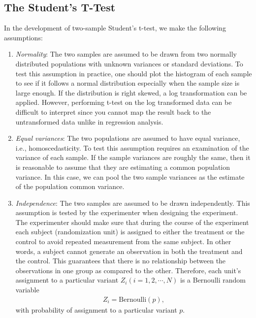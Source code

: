 \documentclass[10pt, aps,twocolumn, superscriptaddress, nofootinbib]{revtex4-2}
\begin{document}
\subsection{The Student's T-Test}
In the development of  two-sample Student's t-test, we make the following assumptions:
\begin{enumerate}
	\item \textit{Normality}: The two samples are assumed to be drawn from two normally distributed populations with unknown variances or standard deviations. To test this assumption in practice, one should plot the histogram of each sample to see if it follows a normal distribution especially when the sample size is large enough. If the distribution is right skewed, a log transformation can be applied. However, performing t-test on the log transformed data can be difficult to interpret since you cannot map the result back to the untransformed data unlike in regression analysis.
	
	
	\item \textit{Equal variances}: The two populations are assumed to have equal variance, i.e.,  homoscedasticity. To test this assumption  requires an examination of the variance of each sample. If the sample variances are roughly the same, then it is reasonable to assume that they are estimating a common population variance. In this case, we can pool the two sample variances as the estimate of the population common  variance. 
	
	\item \textit{Independence}: The two samples are assumed to be drawn independently. This assumption is tested by the experimenter when designing the experiment. The experimenter should make sure that during the course of the experiment each subject (randomization unit) is assigned to either the treatment or the control to avoid repeated measurement from the same subject. In other words, a subject cannot generate an observation in both the treatment and the control.  This guarantees that there is no relationship between the observations in one group as compared to the other.  Therefore, each unit's assignment to a particular variant  $Z_i (i = 1,2,\cdots, N)$ is a Bernoulli random variable
	\begin{align}
	Z_i = \text{Bernoulli}(p),
	\end{align}
	with probability of assignment to a particular variant $p$.
\end{enumerate}
\end{document}
